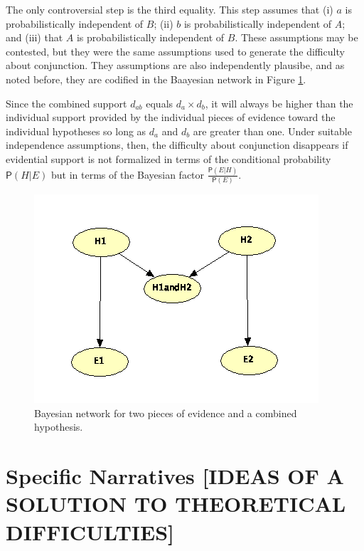 \documentclass[10pt,dvipsnames,enabledeprecatedfontcommands]{scrartcl}
\newcommand{\pr}[1]{\mathsf{P}(#1)}
\begin{document}
\noindent The only controversial step is the third equality. This step
assumes that (i) \(a\) is probabilistically independent of \(B\); (ii)
\(b\) is probabilistically independent of \(A\); and (iii) that \(A\) is
probabilistically independent of \(B\). These assumptions may be
contested, but they were the same assumptions used to generate the
difficulty about conjunction. They assumptions are also independently
plausibe, and as noted before, they are codified in the Baayesian
network in Figure \ref{network-conjunction}.

Since the combined support \(d_{ab}\) equals \(d_{a}\times d_{b}\), it
will always be higher than the individual support provided by the
individual pieces of evidence toward the individual hypotheses so long
as \(d_{a}\) and \(d_{b}\) are greater than one. Under suitable
independence assumptions, then, the difficulty about conjunction
disappears if evidential support is not formalized in terms of the
conditional probability \(\pr{H | E}\) but in terms of the Bayesian
factor \(\frac{\pr{E | H}}{\pr{E}}\).

\begin{figure}
\includegraphics{conjunction-net.png}
\caption{Bayesian network for two pieces of evidence and a combined hypothesis.}
\label{network-conjunction}
\end{figure}

\hypertarget{specific-narratives-ideas-of-a-solution-to-theoretical-difficulties}{%
\section{Specific Narratives {[}IDEAS OF A SOLUTION TO THEORETICAL
DIFFICULTIES{]}}\label{specific-narratives-ideas-of-a-solution-to-theoretical-difficulties}}
\end{document}

